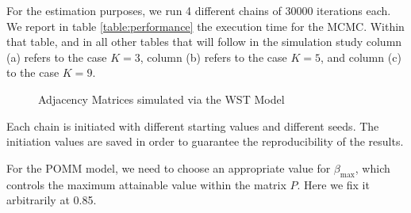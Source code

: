 \documentclass[11pt]{amsart}
\begin{document}
For the estimation purposes, we run 4 different chains of 30000 iterations each. We report in table \eqref{table:performance} the execution time for the MCMC. Within that table, and in all other tables that will follow in the simulation study column (a) refers to the case $K=3$, column (b) refers to the case $K=5$, and column (c) to the case $K=9$.



\begin{figure}[htbp]
    \centering
    \hfill
    \hfill
    \caption{Adjacency Matrices simulated via the WST Model}
    \label{fig:WST_adjacency}
\end{figure}

Each chain is initiated with different starting values and different seeds. The initiation values are saved in order to guarantee the reproducibility of the results.

For the POMM model, we need to choose an appropriate value for $\beta_{\max}$, which controls the maximum attainable value within the matrix $P$. Here we fix it arbitrarily at 0.85.
\end{document}
